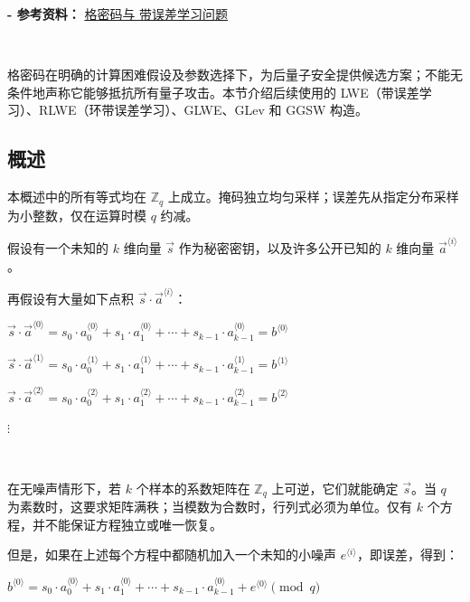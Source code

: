 \textbf{- 参考资料：}
\href{https://mysite.science.uottawa.ca/mnevins/papers/StephenHarrigan2017LWE.pdf}{格密码与
带误差学习问题}~\cite{lattice-crypto}


$ $

格密码在明确的计算困难假设及参数选择下，为后量子安全提供候选方案；不能无条件地声称它能够抵抗所有量子攻击。本节介绍后续使用的 LWE（带误差学习）、RLWE（环带误差学习）、GLWE、GLev 和 GGSW 构造。





\subsection{概述}
\label{subsec:lattice-overview}

本概述中的所有等式均在 $\mathbb Z_q$ 上成立。掩码独立均匀采样；误差先从指定分布采样为小整数，仅在运算时模 $q$ 约减。

假设有一个未知的 $k$ 维向量 $\vec{s}$ 作为秘密密钥，以及许多公开已知的 $k$ 维向量 $\vec{a}^{\langle i \rangle}$。

再假设有大量如下点积 $\vec{s} \cdot \vec{a}^{\langle i \rangle}$：

$\vec{s} \cdot \vec{a}^{\langle 0 \rangle} = s_0\cdot a_{0}^{\langle 0 \rangle} + s_1\cdot a_{1}^{\langle 0 \rangle} + \cdots + s_{k-1}\cdot a_{k-1}^{\langle 0 \rangle} = b^{\langle 0 \rangle}$

$\vec{s} \cdot \vec{a}^{\langle 1 \rangle} = s_0\cdot a_{0}^{\langle 1 \rangle} + s_1\cdot a_{1}^{\langle 1 \rangle} + \cdots + s_{k-1}\cdot a_{k-1}^{\langle 1 \rangle} = b^{\langle 1 \rangle}$

$\vec{s} \cdot \vec{a}^{\langle 2 \rangle} = s_0\cdot a_{0}^{\langle 2 \rangle} + s_1\cdot a_{1}^{\langle 2 \rangle} + \cdots + s_{k-1}\cdot a_{k-1}^{\langle 2 \rangle} = b^{\langle 2 \rangle}$

\text{ } $\vdots$

$ $

在无噪声情形下，若 $k$ 个样本的系数矩阵在 $\mathbb Z_q$ 上可逆，它们就能确定 $\vec s$。当 $q$ 为素数时，这要求矩阵满秩；当模数为合数时，行列式必须为单位。仅有 $k$ 个方程，并不能保证方程独立或唯一恢复。

但是，如果在上述每个方程中都随机加入一个未知的小噪声 $e^{\langle i \rangle}$，即误差，得到：

$b^{\langle 0 \rangle} = s_0\cdot a_{0}^{\langle 0 \rangle} + s_1\cdot a_{1}^{\langle 0 \rangle} + \cdots + s_{k-1}\cdot a_{k-1}^{\langle 0 \rangle} + e^{\langle 0 \rangle} \pmod q$

